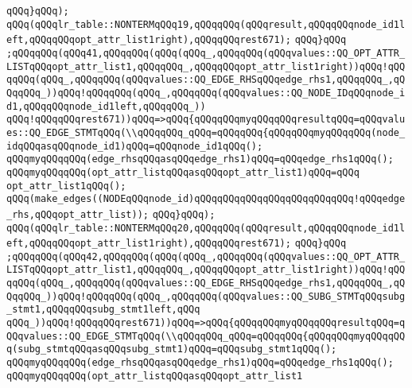 \verb|qQQq}qQQq);|\newline
\verb|qQQq(qQQqlr_table::NONTERMqQQq19,qQQqqQQq(qQQqresult,qQQqqQQqnode_id1left,qQQqqQQqopt_attr_list1right),qQQqqQQqrest671);|\newline
\verb|qQQq}qQQq|\newline
\verb|;qQQqqQQq(qQQq41,qQQqqQQq(qQQq(qQQq_,qQQqqQQq(qQQqvalues::QQ_OPT_ATTR_LISTqQQqopt_attr_list1,qQQqqQQq_,qQQqqQQqopt_attr_list1right))qQQq!qQQqqQQq(qQQq_,qQQqqQQq(qQQqvalues::QQ_EDGE_RHSqQQqedge_rhs1,qQQqqQQq_,qQQqqQQq_))qQQq!qQQqqQQq(qQQq_,qQQqqQQq(qQQqvalues::QQ_NODE_IDqQQqnode_id1,qQQqqQQqnode_id1left,qQQqqQQq_))|\newline
\verb|qQQq!qQQqqQQqrest671))qQQq=>qQQq{qQQqqQQqmyqQQqqQQqresultqQQq=qQQqvalues::QQ_EDGE_STMTqQQq(\\qQQqqQQq_qQQq=qQQqqQQq{qQQqqQQqmyqQQqqQQq(node_idqQQqasqQQqnode_id1)qQQq=qQQqnode_id1qQQq();|\newline
\verb|qQQqmyqQQqqQQq(edge_rhsqQQqasqQQqedge_rhs1)qQQq=qQQqedge_rhs1qQQq();|\newline
\verb|qQQqmyqQQqqQQq(opt_attr_listqQQqasqQQqopt_attr_list1)qQQq=qQQq|\newline
\verb|opt_attr_list1qQQq();|\newline
\verb|qQQq(make_edges((NODEqQQqnode_id)qQQqqQQqqQQqqQQqqQQqqQQqqQQq!qQQqedge_rhs,qQQqopt_attr_list));|\newline
\verb|qQQq}qQQq);|\newline
\verb|qQQq(qQQqlr_table::NONTERMqQQq20,qQQqqQQq(qQQqresult,qQQqqQQqnode_id1left,qQQqqQQqopt_attr_list1right),qQQqqQQqrest671);|\newline
\verb|qQQq}qQQq|\newline
\verb|;qQQqqQQq(qQQq42,qQQqqQQq(qQQq(qQQq_,qQQqqQQq(qQQqvalues::QQ_OPT_ATTR_LISTqQQqopt_attr_list1,qQQqqQQq_,qQQqqQQqopt_attr_list1right))qQQq!qQQqqQQq(qQQq_,qQQqqQQq(qQQqvalues::QQ_EDGE_RHSqQQqedge_rhs1,qQQqqQQq_,qQQqqQQq_))qQQq!qQQqqQQq(qQQq_,qQQqqQQq(qQQqvalues::QQ_SUBG_STMTqQQqsubg_stmt1,qQQqqQQqsubg_stmt1left,qQQq|\newline
\verb|qQQq_))qQQq!qQQqqQQqrest671))qQQq=>qQQq{qQQqqQQqmyqQQqqQQqresultqQQq=qQQqvalues::QQ_EDGE_STMTqQQq(\\qQQqqQQq_qQQq=qQQqqQQq{qQQqqQQqmyqQQqqQQq(subg_stmtqQQqasqQQqsubg_stmt1)qQQq=qQQqsubg_stmt1qQQq();|\newline
\verb|qQQqmyqQQqqQQq(edge_rhsqQQqasqQQqedge_rhs1)qQQq=qQQqedge_rhs1qQQq();|\newline
\verb|qQQqmyqQQqqQQq(opt_attr_listqQQqasqQQqopt_attr_list1|\newline
